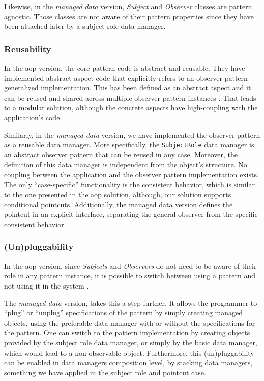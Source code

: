 Likewise, in the \textit{managed data} version, \textit{Subject} and \textit{Observer} classes are pattern agnostic.
Those classes are not aware of their pattern properties since they have been attached later by a subject role data manager.

\subsubsection{Reusability}
In the \ac{aop} version, the core pattern code is abstract and reusable. 
They have implemented abstract aspect code that explicitly refers to an observer pattern generalized implementation.
This has been defined as an abstract aspect and it can be reused and shared across multiple observer pattern instances \cite{hannemann2005role}.
That leads to a modular solution, although the concrete aspects have high-coupling with the application's code.

Similarly, in the \textit{managed data} version, we have implemented the observer pattern as a reusable data manager.
More specifically, the \texttt{SubjectRole} data manager is an abstract observer pattern that can be reused in any case.
Moreover, the definition of this data manager is independent from the object's structure.
No coupling between the application and the observer pattern implementation exists.
The only ``case-specific'' functionality is the consistent behavior, which is similar to the one presented in the \ac{aop} solution, although, our solution supports conditional pointcuts.
Additionally, the managed data version defines the pointcut in an explicit interface, separating the general observer from the specific consistent behavior.

\subsubsection{(Un)pluggability}
In the \ac{aop} version, since \textit{Subjects} and \textit{Observers} do not need to be aware of their role in any pattern instance, it is possible to switch between using a pattern and not using it in the system \cite{hannemann2005role}. 

The \textit{managed data} version, takes this a step further.
It allows the programmer to ``plug'' or ``unplug'' specifications of the pattern by simply creating managed objects, using the preferable data manager with or without the specifications for the pattern.
One can switch to the pattern implementation by creating objects provided by the subject role data manager, or simply by the basic data manager, which would lead to a non-observable object.
Furthermore, this (un)pluggability can be enabled in data managers composition level, by stacking data managers, something we have applied in the subject role and pointcut case.

